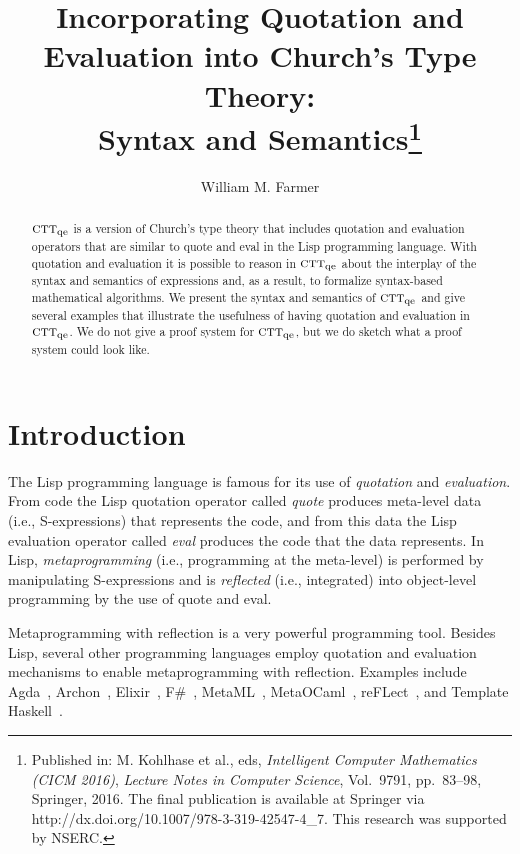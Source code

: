 \documentclass[fleqn]{llncs}
\title{Incorporating Quotation and Evaluation into Church's Type
  Theory:\\ Syntax and Semantics\thanks{Published in: M. Kohlhase et
    al., eds, \emph{Intelligent Computer Mathematics (CICM 2016)},
    \emph{Lecture Notes in Computer Science}, Vol.~9791, pp.~83--98,
    Springer, 2016. The final publication is available at Springer via
    http://dx.doi.org/10.1007/978-3-319-42547-4\_7. This research was
    supported by NSERC.}}
\author{William M. Farmer}
\institute{Computing and Software, McMaster University, Canada\\
\email{wmfarmer@mcmaster.ca}\\[1.5ex]
27 July 2016
}
\newcommand{\churchqe}{$\mbox{\sc ctt}_{\rm qe}$}
\begin{document}
\maketitle

\begin{abstract}
{\churchqe} is a version of Church's type theory that includes
quotation and evaluation operators that are similar to quote and eval
in the Lisp programming language.  With quotation and evaluation it is
possible to reason in {\churchqe} about the interplay of the syntax
and semantics of expressions and, as a result, to formalize
syntax-based mathematical algorithms.  We present the syntax and
semantics of {\churchqe} and give several examples that illustrate the
usefulness of having quotation and evaluation in {\churchqe}.  We do
not give a proof system for {\churchqe}, but we do sketch what a proof
system could look like.
\end{abstract}

\iffalse
\textbf{Keywords:} Church's type theory, metareasoning, reflection,
quotation, evaluation, quasiquotation, schemas, syntax-based
mathematical algorithms, meaning formulas, substitution.
\fi
    
\section{Introduction}

The Lisp programming language is famous for its use of
\emph{quotation} and \emph{evaluation}.  From code the Lisp quotation
operator called \emph{quote} produces meta-level data (i.e.,
S-expressions) that represents the code, and from this data the Lisp
evaluation operator called \emph{eval} produces the code that the data
represents.  In Lisp, \emph{metaprogramming} (i.e., programming at the
meta-level) is performed by manipulating S-expressions and is
\emph{reflected} (i.e., integrated) into object-level programming by
the use of quote and eval.

Metaprogramming with reflection is a very powerful programming tool.
Besides Lisp, several other programming languages employ quotation and
evaluation mechanisms to enable metaprogramming with reflection.
Examples include Agda~\cite{Norell07,Norell09}, Archon~\cite{Stump09},
Elixir~\cite{Elixir15}, F\#~\cite{FSharp15},
MetaML~\cite{TahaSheard00}, MetaOCaml~\cite{MetaOCaml11},
reFLect~\cite{GrundyEtAl06}, and Template
Haskell~\cite{SheardJones02}.
\end{document}

